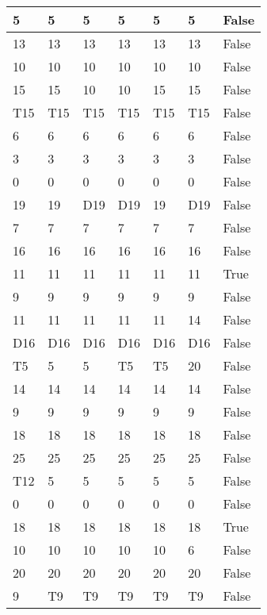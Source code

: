 \begin{longtable}[htbp]{| p{} | p{} | p{}| p{}| p{}| p{}| p{}|}
5 & 5 & 5 & 5 & 5 & 5 & False \\ \hline
13 & 13 & 13 & 13 & 13 & 13 & False \\ \hline
10 & 10 & 10 & 10 & 10 & 10 & False \\ \hline
15 & 15 & 10 & 10 & 15 & 15 & False \\ \hline
\multicolumn{1}{|l|}{T15} & \multicolumn{1}{l|}{T15} & \multicolumn{1}{l|}{T15} & \multicolumn{1}{l|}{T15} & \multicolumn{1}{l|}{T15} & \multicolumn{1}{l|}{T15} & False \\ \hline
6 & 6 & 6 & 6 & 6 & 6 & False \\ \hline
3 & 3 & 3 & 3 & 3 & 3 & False \\ \hline
0 & 0 & 0 & 0 & 0 & 0 & False \\ \hline
19 & 19 & \multicolumn{1}{l|}{D19} & \multicolumn{1}{l|}{D19} & 19 & \multicolumn{1}{l|}{D19} & False \\ \hline
7 & 7 & 7 & 7 & 7 & 7 & False \\ \hline
16 & 16 & 16 & 16 & 16 & 16 & False \\ \hline
11 & 11 & 11 & 11 & 11 & 11 & True \\ \hline
9 & 9 & 9 & 9 & 9 & 9 & False \\ \hline
11 & 11 & 11 & 11 & 11 & 14 & False \\ \hline
\multicolumn{1}{|l|}{D16} & \multicolumn{1}{l|}{D16} & \multicolumn{1}{l|}{D16} & \multicolumn{1}{l|}{D16} & \multicolumn{1}{l|}{D16} & \multicolumn{1}{l|}{D16} & False \\ \hline
\multicolumn{1}{|l|}{T5} & 5 & 5 & \multicolumn{1}{l|}{T5} & \multicolumn{1}{l|}{T5} & 20 & False \\ \hline
14 & 14 & 14 & 14 & 14 & 14 & False \\ \hline
9 & 9 & 9 & 9 & 9 & 9 & False \\ \hline
18 & 18 & 18 & 18 & 18 & 18 & False \\ \hline
25 & 25 & 25 & 25 & 25 & 25 & False \\ \hline
\multicolumn{1}{|l|}{T12} & 5 & 5 & 5 & 5 & 5 & False \\ \hline
0 & 0 & 0 & 0 & 0 & 0 & False \\ \hline
18 & 18 & 18 & 18 & 18 & 18 & True \\ \hline
10 & 10 & 10 & 10 & 10 & 6 & False \\ \hline
20 & 20 & 20 & 20 & 20 & 20 & False \\ \hline
9 & \multicolumn{1}{l|}{T9} & \multicolumn{1}{l|}{T9} & \multicolumn{1}{l|}{T9} & \multicolumn{1}{l|}{T9} & \multicolumn{1}{l|}{T9} & False \\ \hline

\end{longtable}
